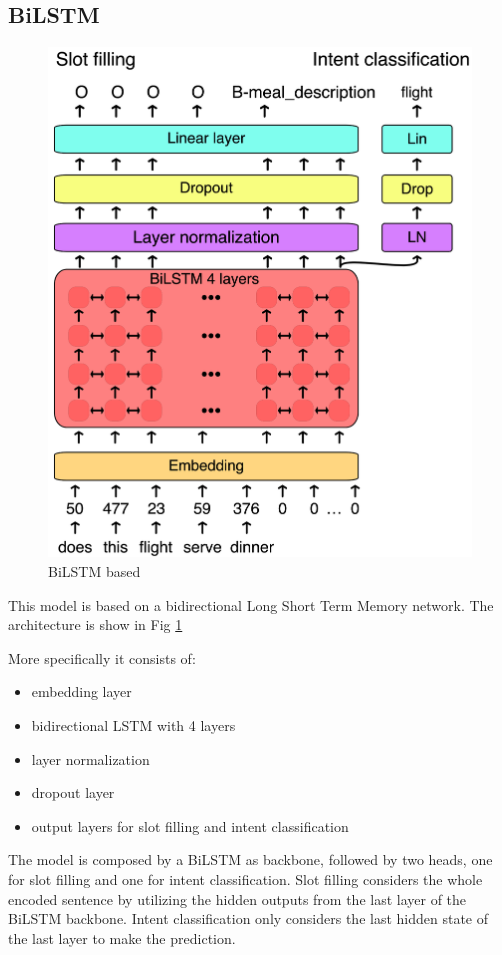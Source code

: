 \documentclass[a4paper]{article}
\begin{document}
\subsection{BiLSTM}
\begin{figure}[h!]
	\centering
	\includegraphics[width=0.8\linewidth]{../assets/images/BiLSTM}
	\caption{BiLSTM based}
	\label{fig:bilstm}
\end{figure}

This model is based on a bidirectional Long Short Term Memory network. The architecture is show in Fig \ref{fig:bilstm}

More specifically it consists of:
\begin{itemize}
	\item embedding layer
	\item bidirectional LSTM with 4 layers
	\item layer normalization
	\item dropout layer
	\item output layers for slot filling and intent classification
\end{itemize}

The model is composed by a BiLSTM as backbone, followed by two heads, one for slot filling and one for intent classification. Slot filling considers the whole encoded sentence by utilizing the hidden outputs from the last layer of the BiLSTM backbone. Intent classification only considers the last hidden state of the last layer to make the prediction.
\end{document}
